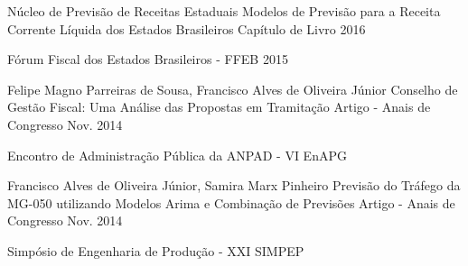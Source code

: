 \begin{cventries}

  \cventry
    {Núcleo de Previsão de Receitas Estaduais}
    {Modelos de Previsão para a Receita Corrente Líquida dos Estados Brasileiros}
    {Capítulo de Livro}
    {2016}
    {
      \begin{cvitems}
        \item {Fórum Fiscal dos Estados Brasileiros - FFEB 2015}
      \end{cvitems}
    }

  \cventry
    {Felipe Magno Parreiras de Sousa, Francisco Alves de Oliveira Júnior} 
    {Conselho de Gestão Fiscal: Uma Análise das Propostas em Tramitação}
    {Artigo - Anais de Congresso}
    {Nov. 2014}
    {
      \begin{cvitems}
        \item {Encontro de Administração Pública da ANPAD - VI EnAPG}
      \end{cvitems}
    }


  \cventry
    {Francisco Alves de Oliveira Júnior, Samira Marx Pinheiro}
    {Previsão do Tráfego da MG-050 utilizando Modelos Arima e Combinação de Previsões}
    {Artigo - Anais de Congresso}
    {Nov. 2014}
    {
      \begin{cvitems}
        \item {Simpósio de Engenharia de Produção - XXI SIMPEP}
      \end{cvitems}
    }


\end{cventries}